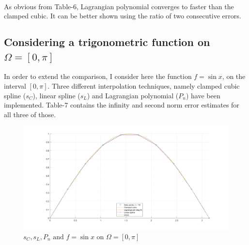 \documentclass[12pt]{article}
\begin{document}
\\As obvious from Table-6, Lagrangian polynomial converges to faster than the clamped cubic. It can be better shown using the ratio of two consecutive errors. 

\subsection{Considering a trigonometric function on $\Omega = [0, \pi]$}
In order to extend the comparison, I consider here the function $f = \sin x$, on the interval $[0, \pi]$. Three different interpolation techniques, namely clamped cubic spline ($s_C$), linear spline ($s_L$) and Lagrangian polynomial ($P_n$) have been implemented. Table-7 contains the infinity and second norm error estimates for all three of those.
\begin{figure}
    \centering
    \includegraphics[scale = 0.25]{clmp_lag_sin.png}
    \caption{$s_C, s_L, P_n \text{ and } f = \sin x$ on $\Omega = [0, \pi]$}
\end{figure}
\end{document}

